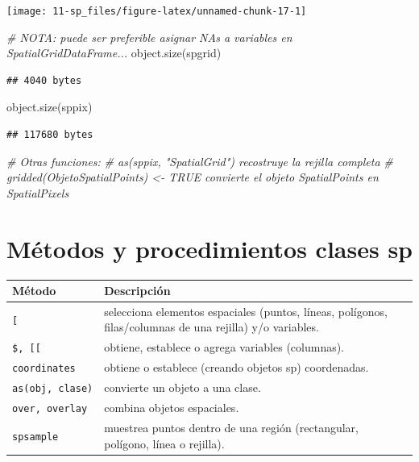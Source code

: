 \documentclass[
  spanish,
]{book}
\newenvironment{Shaded}{\begin{snugshade}}{\end{snugshade}}
\newcommand{\CommentTok}[1]{\textcolor[rgb]{0.56,0.35,0.01}{\textit{#1}}}
\newcommand{\FunctionTok}[1]{\textcolor[rgb]{0.00,0.00,0.00}{#1}}
\newcommand{\NormalTok}[1]{#1}
\theoremstyle{break}
\begin{document}
\begin{center}\texttt{[image: 11-sp\_files/figure-latex/unnamed-chunk-17-1]} \end{center}

\begin{Shaded}
\begin{Highlighting}[]
\CommentTok{\# NOTA: puede ser preferible asignar NA\textquotesingle{}s a variables en SpatialGridDataFrame...}
\FunctionTok{object.size}\NormalTok{(spgrid)}
\end{Highlighting}
\end{Shaded}

\begin{verbatim}
## 4040 bytes
\end{verbatim}

\begin{Shaded}
\begin{Highlighting}[]
\FunctionTok{object.size}\NormalTok{(sppix)}
\end{Highlighting}
\end{Shaded}

\begin{verbatim}
## 117680 bytes
\end{verbatim}

\begin{Shaded}
\begin{Highlighting}[]
\CommentTok{\# Otras funciones:}
\CommentTok{\# as(sppix, "SpatialGrid") recostruye la rejilla completa}
\CommentTok{\# gridded(ObjetoSpatialPoints) \textless{}{-} TRUE  convierte el objeto SpatialPoints en SpatialPixels}
\end{Highlighting}
\end{Shaded}

\hypertarget{muxe9todos-y-procedimientos-clases-sp}{%
\section{Métodos y procedimientos clases sp}\label{muxe9todos-y-procedimientos-clases-sp}}

\begin{longtable}[]{@{}
  >{\raggedright\arraybackslash}p{}
  >{\raggedright\arraybackslash}p{}@{}}
\toprule
Método & Descripción \\
\midrule
\endhead
\texttt{{[}} & selecciona elementos espaciales (puntos, líneas, polígonos, filas/columnas de una rejilla) y/o variables. \\
\texttt{\$,\ {[}{[}} & obtiene, establece o agrega variables (columnas). \\
\texttt{coordinates} & obtiene o establece (creando objetos sp) coordenadas. \\
\texttt{as(obj,\ clase)} & convierte un objeto a una clase. \\
\texttt{over,\ overlay} & combina objetos espaciales. \\
\texttt{spsample} & muestrea puntos dentro de una región (rectangular, polígono, línea o rejilla). \\
\bottomrule
\end{longtable}
\end{document}
